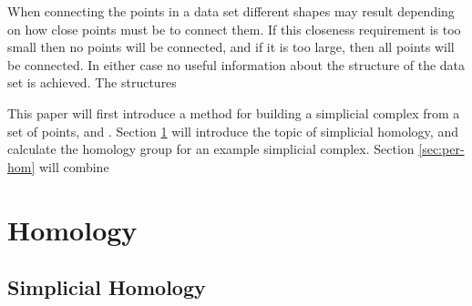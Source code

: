 When connecting the points in a data set different shapes may result depending on how close points must be to connect them. If this closeness requirement is too small then no points will be connected, and if it is too large, then all points will be connected. In either case no useful information about the structure of the data set is achieved. The structures

This paper will first introduce a method for building a simplicial complex from a set of points, and . Section \ref{sec:homology} will introduce the topic of simplicial homology, and calculate the homology group for an example simplicial complex. Section \ref{sec:per-hom} will combine


%     


\section{Homology}\label{sec:homology}


\subsection{Simplicial Homology}\label{subsec:simpl-hom}


